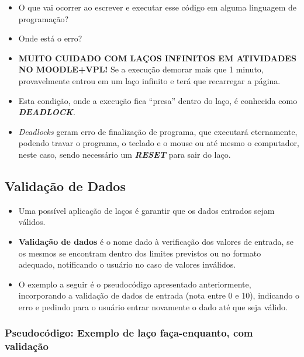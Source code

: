\documentclass[12pt,a4paper]{article}
\providecommand{\tightlist}{%
      \setlength{\itemsep}{0pt}\setlength{\parskip}{0pt}}
\begin{document}
    \begin{itemize}
\tightlist
\item
  O que vai ocorrer ao escrever e executar esse código em alguma
  linguagem de programação?
\item
  Onde está o erro?
\item
  \textbf{MUITO CUIDADO COM LAÇOS INFINITOS EM ATIVIDADES NO
  MOODLE+VPL!} Se a execução demorar mais que 1 minuto, provavelmente
  entrou em um laço infinito e terá que recarregar a página.
\item
  Esta condição, onde a execução fica ``presa'' dentro do laço, é
  conhecida como \textbf{\emph{DEADLOCK}}.
\item
  \emph{Deadlocks} geram erro de finalização de programa, que executará
  eternamente, podendo travar o programa, o teclado e o mouse ou até
  mesmo o computador, neste caso, sendo necessário um
  \textbf{\emph{RESET}} para sair do laço.
\end{itemize}

    \hypertarget{validauxe7uxe3o-de-dados}{%
\subsection{Validação de Dados}\label{validauxe7uxe3o-de-dados}}

    \begin{itemize}
\item
  Uma possível aplicação de laços é garantir que os dados entrados sejam
  válidos.
\item
  \textbf{Validação de dados} é o nome dado à verificação dos valores de
  entrada, se os mesmos se encontram dentro dos limites previstos ou no
  formato adequado, notificando o usuário no caso de valores inválidos.
\item
  O exemplo a seguir é o pseudocódigo apresentado anteriormente,
  incorporando a validação de dados de entrada (nota entre 0 e 10),
  indicando o erro e pedindo para o usuário entrar novamente o dado até
  que seja válido.
\end{itemize}

    \hypertarget{pseudocuxf3digo-exemplo-de-lauxe7o-fauxe7a-enquanto-com-validauxe7uxe3o}{%
\subsubsection{Pseudocódigo: Exemplo de laço faça-enquanto, com
validação}\label{pseudocuxf3digo-exemplo-de-lauxe7o-fauxe7a-enquanto-com-validauxe7uxe3o}}
\end{document}
